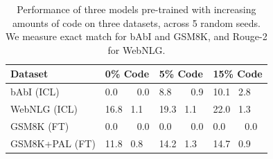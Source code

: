 \begin{table}[h]
    \centering
   
    \small
    \begin{tabular}{llll}
        \toprule
        \textbf{Dataset} & \textbf{0\% Code} & \textbf{5\% Code} & \textbf{15\% Code} \\
        \midrule
	bAbI (ICL) & 0.0~~~\textpm~0.0 & 8.8~~~\textpm~0.9 & 10.1 \textpm~2.8 \\
	WebNLG (ICL) & 16.8 \textpm~1.1 & 19.3 \textpm~1.1 & 22.0 \textpm~1.3 \\
	GSM8K (FT) & 0.0~~~\textpm~0.0 & 0.0~~~\textpm~0.0 & 0.0~~~\textpm~0.0 \\
	GSM8K+PAL (FT) & 11.8 \textpm~0.8 & 14.2 \textpm~1.3 & 14.7 \textpm~0.9 \\
    \bottomrule
    
    \end{tabular}
    \caption{
    Performance of three models pre-trained with increasing amounts of code on three datasets, across 5 random seeds. 
    We measure exact match for bAbI and GSM8K, and Rouge-2 for WebNLG.
    }
    \label{tab:code-reasoning}
\end{table}

